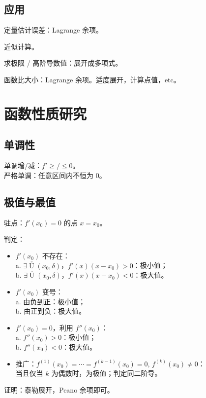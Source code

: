 \documentclass[12pt, a4paper, UTF8, openany]{ctexbook}
\newcommand{\difk}[2]{{#1}^{(#2)}}
\newcommand{\uzero}{\mathop{U}\limits^{\circ}}%
\begin{document}
        \subsection{应用}
        定量估计误差：Lagrange 余项。

        近似计算。

        求极限 / 高阶导数值：展开成多项式。

        函数比大小：Lagrange 余项。适度展开，计算点值，etc。

        \newpage

    \section{函数性质研究}
        \subsection{单调性}
        单调增/减：$f' \geqslant / \leqslant 0$。\\
        严格单调：任意区间内不恒为 0。

        \subsection{极值与最值}
        驻点：$f'(x_0) = 0$ 的点 $x = x_0$。

        判定：
        \begin{itemize}
            \item $f'(x_0)$ 不存在：\\
                a. $\exists \uzero(x_0, \delta)$，$f'(x)(x - x_0) > 0$：极小值；\\
                b. $\exists \uzero(x_0, \delta)$，$f'(x)(x - x_0) < 0$：极大值。
            \item $f'(x_0)$ 变号：\\
                a. 由负到正：极小值；\\
                b. 由正到负：极大值。
            \item $f'(x_0) = 0$，利用 $f''(x_0)$：\\
                a. $f''(x_0) > 0$：极小值；\\
                b. $f''(x_0) < 0$：极大值。
            \item 推广：$\difk{f}{1}(x_0) = \cdots = \difk{f}{k - 1}(x_0) = 0, \, \difk{f}{k}(x_0) \neq 0$：\\
                {\heiti 当且仅当 $k$ 为偶数}时，为极值；判定同二阶导。
        \end{itemize}
        证明：泰勒展开，Peano 余项即可。
\end{document}
